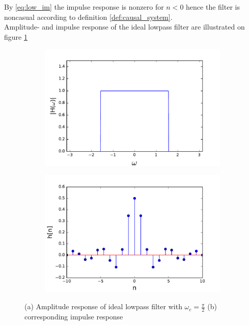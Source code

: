 By \eqref{eq:low_im} the impulse response is nonzero for $n<0$ hence the filter is noncasual according to definition \ref{def:causal_system}.\\
Amplitude- and impulse response of the ideal lowpass filter are illustrated on figure \ref{fig:ideal_low}
\begin{figure}[H]
\begin{subfigure}[b]{0.50\textwidth}
        \centering
\includegraphics[scale=0.45]{figures/filter_teori/ideal_low2.pdf}
\caption{}
\end{subfigure}
\begin{subfigure}[b]{0.50\textwidth}
        \centering  
\includegraphics[scale=0.45]{figures/filter_teori/ideal_low1.pdf}
\caption{}
 \end{subfigure}
\caption{ (a) Amplitude response of ideal lowpass filter with $\omega_c = \frac{\pi}{2}$ (b) corresponding impulse response}
\label{fig:ideal_low}
\end{figure}


